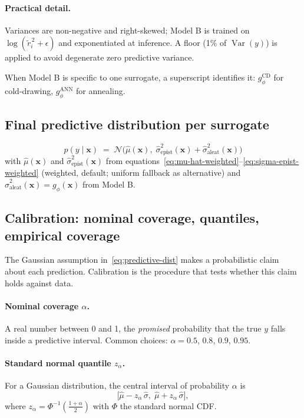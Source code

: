 \documentclass[11pt,a4paper]{article}
\DeclareMathOperator{\Var}{Var}
\begin{document}
\paragraph{Practical detail.} Variances are non-negative and right-skewed; Model B is trained on $\log(\tilde r_i^{\,2} + \epsilon)$ and exponentiated at inference. A floor (1\% of $\Var(y)$) is applied to avoid degenerate zero predictive variance.

When Model B is specific to one surrogate, a superscript identifies it: $g_\phi^{\text{CD}}$ for cold-drawing, $g_\phi^{\text{ANN}}$ for annealing.

\subsection{Final predictive distribution per surrogate}
\label{sec:final-pred-dist}

\begin{equation}
\boxed{\;
p(y \mid \bm x) \;=\; \mathcal{N}\!\Big( \hat\mu(\bm x), \; \hat\sigma^2_{\text{epist}}(\bm x) + \hat\sigma^2_{\text{aleat}}(\bm x) \Big)
\;}
\label{eq:predictive-dist}
\end{equation}
with $\hat\mu(\bm x)$ and $\hat\sigma^2_{\text{epist}}(\bm x)$ from equations~\eqref{eq:mu-hat-weighted}--\eqref{eq:sigma-epist-weighted} (weighted, default; uniform fallback as alternative) and $\hat\sigma^2_{\text{aleat}}(\bm x) = g_\phi(\bm x)$ from Model B.

\subsection{Calibration: nominal coverage, quantiles, empirical coverage}
\label{sec:calibration-vocab}

The Gaussian assumption in~\eqref{eq:predictive-dist} makes a probabilistic claim about each prediction. Calibration is the procedure that tests whether this claim holds against data.

\paragraph{Nominal coverage $\alpha$.} A real number between 0 and 1, the \emph{promised} probability that the true $y$ falls inside a predictive interval. Common choices: $\alpha = 0.5$, $0.8$, $0.9$, $0.95$.

\paragraph{Standard normal quantile $z_\alpha$.} For a Gaussian distribution, the central interval of probability $\alpha$ is
\[
\big[\hat\mu - z_\alpha \, \hat\sigma,\; \hat\mu + z_\alpha \, \hat\sigma\big],
\]
where $z_\alpha = \Phi^{-1}\!\left(\tfrac{1+\alpha}{2}\right)$ with $\Phi$ the standard normal CDF.
\end{document}
